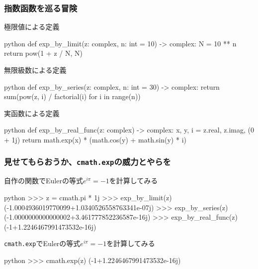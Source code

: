\documentclass[dvipdfmx,11pt,notheorems]{beamer}
\theoremstyle{definition}
\begin{document}
\begin{frame}[fragile]\frametitle{指数函数を巡る冒険}

\begin{exampleblock}{極限値による定義}
\begin{pygments}{python}
def exp_by_limit(z: complex, n: int = 10) -> complex:
    N = 10 ** n
    return pow(1 + z / N, N)
\end{pygments}
\end{exampleblock}

\begin{exampleblock}{無限級数による定義}
\begin{pygments}{python}
def exp_by_series(z: complex, n: int = 30) -> complex:
    return sum(pow(z, i) / factorial(i) for i in range(n))
\end{pygments}
\end{exampleblock}

\begin{exampleblock}{実函数による定義}
\begin{pygments}{python}
def exp_by_real_func(z: complex) -> complex:
    x, y, i = z.real, z.imag, (0 + 1j)
    return math.exp(x) * (math.cos(y) + math.sin(y) * i)
\end{pygments}
\end{exampleblock}

\end{frame}

\begin{frame}[fragile]\frametitle{見せてもらおうか、\texttt{cmath.exp}の威力とやらを}
\begin{exampleblock}{自作の関数でEulerの等式$e^{i\pi} = -1$を計算してみる}
\begin{pygments}{python}
>>> z = cmath.pi * 1j
>>> exp_by_limit(z)
(-1.0004936019770099+1.0340526558763341e-07j)
>>> exp_by_series(z)
(-1.0000000000000002+3.461777852236587e-16j)
>>> exp_by_real_func(z)
(-1+1.2246467991473532e-16j)
\end{pygments}
\end{exampleblock}

\begin{exampleblock}{\texttt{cmath.exp}でEulerの等式$e^{i\pi} = -1$を計算してみる}
\begin{pygments}{python}
>>> cmath.exp(z)
(-1+1.2246467991473532e-16j)
\end{pygments}
\end{exampleblock}

\end{frame}
\end{document}
